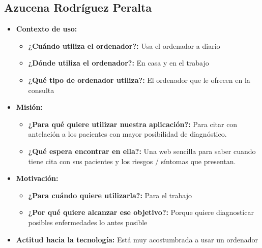 \subsection{Azucena Rodríguez Peralta}
\begin{itemize}
    \item \textbf{Contexto de uso: }
    \begin{itemize}
        \item \textbf{¿Cuándo utiliza el ordenador?: }  Usa el ordenador a diario
        \item \textbf{¿Dónde utiliza el ordenador?: } En casa y en el trabajo
        \item \textbf{¿Qué tipo de ordenador utiliza?: } El ordenador que le ofrecen en la consulta
    \end{itemize}
    \item \textbf{Misión: }
    \begin{itemize}
        \item \textbf{¿Para qué quiere utilizar nuestra aplicación?: } Para citar con antelación a los pacientes con mayor posibilidad de diagnóstico.
        \item \textbf{¿Qué espera encontrar en ella?: } Una web sencilla para saber cuando tiene cita con sus pacientes y los riesgos / síntomas que presentan.
    \end{itemize}
    \item \textbf{Motivación: }
    \begin{itemize}
        \item \textbf{¿Para cuándo quiere utilizarla?: } Para el trabajo
        \item \textbf{¿Por qué quiere alcanzar ese objetivo?: } Porque quiere diagnosticar posibles enfermedades lo antes posible
    \end{itemize}
    \item \textbf{Actitud hacia la tecnología: } Está muy acostumbrada a usar un ordenador
\end{itemize}

